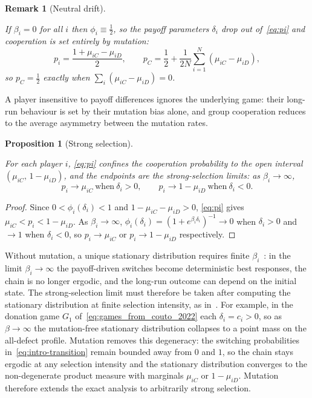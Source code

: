 \documentclass[11pt]{article}
\newtheorem{proposition}{Proposition}
\newtheorem{remark}{Remark}
\newcommand{\pC}{p_C}
\begin{document}
\begin{remark}[Neutral drift]\label{rem:neutral}

If \(\beta_i=0\) for all \(i\) then \(\phi_i\equiv\tfrac{1}{2}\), so the payoff
parameters
\(\delta_i\) drop out of~\eqref{eq:pi} and cooperation is set entirely by mutation:
\[
  p_i = \frac{1+\mu_{iC}-\mu_{iD}}{2}, \qquad
  \pC = \frac{1}{2}+\frac{1}{2N}\sum_{i=1}^{N}(\mu_{iC}-\mu_{iD}),
\]
so \(\pC=\tfrac{1}{2}\) exactly when \(\sum_i(\mu_{iC}-\mu_{iD})=0\).

\end{remark}

A player insensitive to payoff differences ignores the underlying game: their long-run
behaviour is set by their mutation bias alone, and group cooperation reduces to the
average asymmetry between the mutation rates.

\begin{proposition}[Strong selection]\label{prop:strong}

For each player \(i\), \eqref{eq:pi} confines the cooperation probability to the open
interval \((\mu_{iC},\,1-\mu_{iD})\), and the endpoints are the strong-selection limits:
as \(\beta_i\to\infty\),
\[
  p_i \to \mu_{iC} \ \text{when}\ \delta_i>0, \qquad
  p_i \to 1-\mu_{iD} \ \text{when}\ \delta_i<0.
\]

\end{proposition}

\begin{proof}

Since \(0<\phi_i(\delta_i)<1\) and \(1-\mu_{iC}-\mu_{iD}>0\), \eqref{eq:pi} gives
\(\mu_{iC}<p_i<1-\mu_{iD}\). As \(\beta_i\to\infty\),
\(\phi_i(\delta_i)=(1+e^{\beta_i\delta_i})^{-1}\to0\) when \(\delta_i>0\) and \(\to1\)
when \(\delta_i<0\), so \(p_i\to\mu_{iC}\) or \(p_i\to1-\mu_{iD}\) respectively.

\end{proof}

Without mutation, a unique stationary distribution requires finite
\(\beta_i\)~\cite{couto2023multiplayer}: in the limit \(\beta_i\to\infty\) the
payoff-driven switches become deterministic best responses, the chain is no
longer ergodic, and the long-run outcome can depend on the initial state. The
strong-selection limit must therefore be taken after computing the stationary
distribution at finite selection intensity, as
in~\cite{couto2022introspection}. For example, in the donation game \(G_1\)
of~\eqref{eq:games_from_couto_2022} each \(\delta_i=c_i>0\), so as
\(\beta\to\infty\) the mutation-free stationary distribution collapses to a
point mass on the all-defect profile. Mutation removes this degeneracy: the
switching probabilities in~\eqref{eq:intro-transition} remain bounded away
from \(0\) and \(1\), so the chain stays ergodic at any selection intensity
and the stationary distribution converges to the non-degenerate product
measure with marginals \(\mu_{iC}\) or \(1-\mu_{iD}\). Mutation therefore
extends the exact analysis to arbitrarily strong selection.
\end{document}
